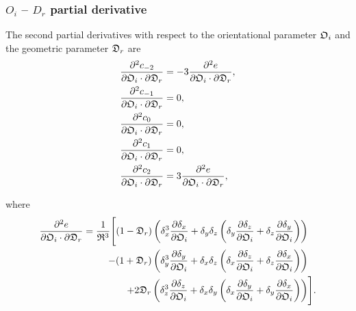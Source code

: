 \begin{latexonly}
    \subsubsection{$O_i$ -- $D_r$ partial derivative}
\end{latexonly}
\begin{htmlonly}
\end{htmlonly}

The second partial derivatives with respect to the orientational parameter $\mathfrak{O}_i$ and the geometric parameter $\mathfrak{D}_r$ are
\begin{subequations}
\begin{align}
    \frac{\partial^2 c_{-2}}{\partial \mathfrak{O}_i \cdot \partial \mathfrak{D}_r}  &=  -3 \frac{\partial^2 e}{\partial \mathfrak{O}_i \cdot \partial \mathfrak{D}_r}, \\
    \frac{\partial^2 c_{-1}}{\partial \mathfrak{O}_i \cdot \partial \mathfrak{D}_r} &= 0, \\
    \frac{\partial^2 c_{0}}{\partial \mathfrak{O}_i \cdot \partial \mathfrak{D}_r}  &= 0, \\
    \frac{\partial^2 c_{1}}{\partial \mathfrak{O}_i \cdot \partial \mathfrak{D}_r}  &= 0, \\
    \frac{\partial^2 c_{2}}{\partial \mathfrak{O}_i \cdot \partial \mathfrak{D}_r}  &= 3 \frac{\partial^2 e}{\partial \mathfrak{O}_i \cdot \partial \mathfrak{D}_r},
\end{align}
\end{subequations}

\noindent where
\begin{align}
    \frac{\partial^2 e}{\partial \mathfrak{O}_i \cdot \partial \mathfrak{D}_r}  =  \frac{1}{\mathfrak{R}^3} \Bigg[
        (1 - \mathfrak{D}_r) \left(
            \delta_x^3 \frac{\partial \delta_x}{\partial \mathfrak{O}_i}
            +  \delta_y \delta_z \left( \delta_y \frac{\partial \delta_z}{\partial \mathfrak{O}_i}  +  \delta_z \frac{\partial \delta_y}{\partial \mathfrak{O}_i} \right) \right) & \nonumber \\
        -  (1 + \mathfrak{D}_r) \left(
            \delta_y^3 \frac{\partial \delta_y}{\partial \mathfrak{O}_i}
            +  \delta_x \delta_z \left( \delta_x \frac{\partial \delta_z}{\partial \mathfrak{O}_i}  +  \delta_z \frac{\partial \delta_x}{\partial \mathfrak{O}_i} \right) \right) & \nonumber \\
        +  2 \mathfrak{D}_r \left(
            \delta_z^3 \frac{\partial \delta_z}{\partial \mathfrak{O}_i}
            +  \delta_x \delta_y \left( \delta_x \frac{\partial \delta_y}{\partial \mathfrak{O}_i}  +  \delta_y \frac{\partial \delta_x}{\partial \mathfrak{O}_i} \right) \right) &
    \Bigg].
\end{align}




